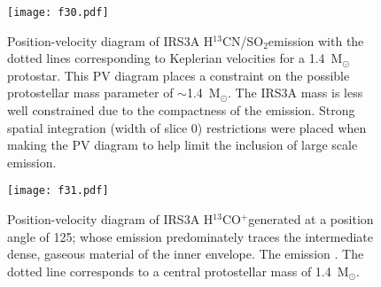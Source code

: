 \documentclass[twocolumn, 12pt]{aastex63}
\newcommand{\htcn}{H$^{13}$CN}
\newcommand{\htcop}{H$^{13}$CO$^+$}
\newcommand{\sot}{SO$_{2}$}
\renewcommand{\deg}{\degr}
\newcommand{\ab}{$\sim$}
\newcommand{\solm}{M$_{\odot}$}
\begin{document}
\begin{figure}[H]
\begin{center}
\texttt{[image: f30.pdf]}
\end{center}
\caption{Position-velocity diagram of IRS3A \htcn/\sot\space emission with the dotted lines corresponding to Keplerian velocities for a 1.4~\solm\space protostar. This PV diagram places a constraint on the possible protostellar mass parameter of \ab1.4~\solm. The IRS3A mass is less well constrained due to the compactness of the emission. Strong spatial integration (width of slice 0) restrictions were placed when making the PV diagram to help limit the inclusion of large scale emission.}\label{fig:l1448irs3a_h13cn_pv}
\end{figure}


\begin{figure}[H]
\begin{center}
   \texttt{[image: f31.pdf]}
\end{center}
   \caption{Position-velocity diagram of IRS3A \htcop\space  generated at a position angle of 125\deg; whose emission predominately traces the intermediate dense, gaseous material of the inner envelope. The emission . The dotted line corresponds to a central protostellar mass of 1.4~\solm.}\label{fig:l1448irs3a_h13cop_pv}
\end{figure}
\end{document}
